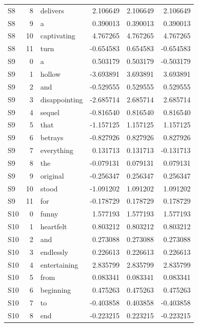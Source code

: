 \begin{longtable}{@{}lrlrrr@{}}
S8 & 8 & delivers & 2.106649 & 2.106649 & 2.106649 \\
S8 & 9 & a & 0.390013 & 0.390013 & 0.390013 \\
S8 & 10 & captivating & 4.767265 & 4.767265 & 4.767265 \\
S8 & 11 & turn & -0.654583 & 0.654583 & -0.654583 \\
S9 & 0 & a & 0.503179 & 0.503179 & -0.503179 \\
S9 & 1 & hollow & -3.693891 & 3.693891 & 3.693891 \\
S9 & 2 & and & -0.529555 & 0.529555 & 0.529555 \\
S9 & 3 & disappointing & -2.685714 & 2.685714 & 2.685714 \\
S9 & 4 & sequel & -0.816540 & 0.816540 & 0.816540 \\
S9 & 5 & that & -1.157125 & 1.157125 & 1.157125 \\
S9 & 6 & betrays & -0.827926 & 0.827926 & 0.827926 \\
S9 & 7 & everything & 0.131713 & 0.131713 & -0.131713 \\
S9 & 8 & the & -0.079131 & 0.079131 & 0.079131 \\
S9 & 9 & original & -0.256347 & 0.256347 & 0.256347 \\
S9 & 10 & stood & -1.091202 & 1.091202 & 1.091202 \\
S9 & 11 & for & -0.178729 & 0.178729 & 0.178729 \\
S10 & 0 & funny & 1.577193 & 1.577193 & 1.577193 \\
S10 & 1 & heartfelt & 0.803212 & 0.803212 & 0.803212 \\
S10 & 2 & and & 0.273088 & 0.273088 & 0.273088 \\
S10 & 3 & endlessly & 0.226613 & 0.226613 & 0.226613 \\
S10 & 4 & entertaining & 2.835799 & 2.835799 & 2.835799 \\
S10 & 5 & from & 0.083341 & 0.083341 & 0.083341 \\
S10 & 6 & beginning & 0.475263 & 0.475263 & 0.475263 \\
S10 & 7 & to & -0.403858 & 0.403858 & -0.403858 \\
S10 & 8 & end & -0.223215 & 0.223215 & -0.223215 \\
\end{longtable}
